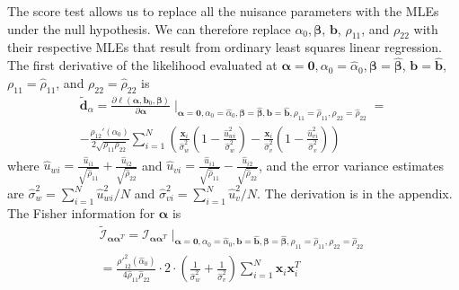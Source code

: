 \documentclass[aap,authoryear, preprint]{imsart}
\numberwithin{equation}{section}
\theoremstyle{plain}
\begin{document}
The score test allows us to replace all the nuisance parameters with the MLEs under the null hypothesis. We can therefore replace $\alpha_0, \bm{\beta}$, $\bm{b}$, $\rho_{11}$, and $\rho_{22}$ with their respective MLEs that result from ordinary least squares linear regression. The first derivative of the likelihood evaluated at $\bm{\alpha}=\bm{0}, \alpha_0 = \hat{\alpha}_0, \bm{\beta} = \bm{\hat{\beta}}$, $\bm{b} = \bm{\hat{b}}$, $\rho_{11} = \hat{\rho}_{11}$, and $\rho_{22} = \hat{\rho}_{22}$ is
\begin{equation}
\begin{multlined}
\bm{\tilde{d}}_{\alpha} = \frac{\partial \ell(\bm{\alpha}, \bm{b}_0, \bm{\beta})} {\partial \bm{\alpha}}\mid_{\bm{\alpha}=\bm{0}, \alpha_0 = \hat{\alpha}_0, \bm{\beta} = \bm{\hat{\beta}}, \bm{b} = \bm{\hat{b}}, \rho_{11} = \hat{\rho}_{11}, \rho_{22} = \hat{\rho}_{22}} =\\
-\frac{\rho_{12}'(\alpha_0)}{2\sqrt{\rho_{11}\rho_{22}}} \sum_{i=1}^{N} \left(
    \frac{\bm{x}_i}{\hat{\sigma}_{w}^2} 
    \left( 1-\frac{\hat{u}_{wi}^2}{\hat{\sigma}_{w}^2}\right) - 
    \frac{\bm{x}_i}{\hat{\sigma}_{v}^2} 
    \left( 1-\frac{\hat{u}_{vi}^2}{\hat{\sigma}_{v}^2}\right) 
    \right)
\end{multlined}
\label{first_derivative}
\end{equation}
where $\hat{u}_{wi} = \frac{\hat{u}_{i1}}{\sqrt{\hat{\rho}_{11}}} +  \frac{\hat{u}_{i2}}{\sqrt{\hat{\rho}_{22}}}$ and $\hat{u}_{vi} = \frac{\hat{u}_{i1}}{\sqrt{\hat{\rho}_{11}}} -  \frac{\hat{u}_{i2}}{\sqrt{\hat{\rho}_{22}}}$, and the error variance estimates are $\hat{\sigma}_w^2 = \sum_{i=1}^{N} \hat{u}_{wi}^2/N$ and $\hat{\sigma}_{vi}^2 = \sum_{i=1}^{N}\hat{u}_v^2/N$. The derivation is in the appendix. The Fisher information for $\bm{\alpha}$ is
\begin{equation}
\begin{multlined}
        \tilde{\mathcal{I}}_{\bm{\alpha}\bm{\alpha}^T} = \mathcal{I}_{\bm{\alpha}\bm{\alpha}^T}\mid_{
        \bm{\alpha}=\bm{0}, 
        \alpha_0 = \hat{\alpha}_0,
        \bm{b} = \bm{\hat{b}},
        \bm{\beta} = \bm{\hat{\beta}},
        {\rho}_{11} = \hat{\rho}_{11},
        {\rho}_{22} = \hat{\rho}_{22}}\\
        = \frac{{\rho'}^2_{12}(\hat{\alpha}_0)}{4\hat{\rho}_{11}\hat{\rho}_{22}}\cdot 2 \cdot \left(\frac{1}{\hat{\sigma}_{w}^2} +  \frac{1}{\hat{\sigma}_{v}^2}\right) \sum_{i=1}^{N} \bm{x}_i \bm{x}_i^T
    \end{multlined}
\end{equation}
\end{document}
